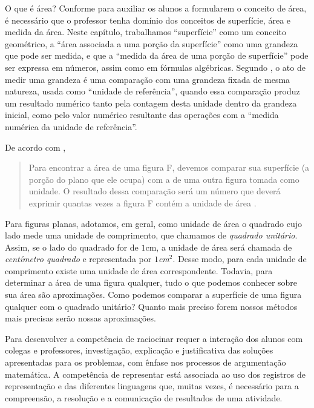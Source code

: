 \begin{paginatexto}{O que é área?}
Conforme \citet{santos2014} para auxiliar os alunos a formularem o conceito de área, é necessário que o professor tenha domínio dos conceitos de superfície, área e medida da área. Neste capítulo, trabalhamos “superfície” como um conceito geométrico, a “área associada a uma porção da superfície” como uma grandeza que pode ser medida, e que a “medida da área de uma porção de superfície” pode ser expressa em números, assim como em fórmulas algébricas. Segundo \citet{lima2013}, o ato de medir uma grandeza é uma comparação com uma grandeza fixada de mesma natureza, usada como “unidade de referência”, quando essa comparação produz um resultado numérico tanto pela contagem desta unidade dentro da grandeza inicial, como pelo valor numérico resultante das operações com a “medida numérica da unidade de referência”.

De acordo com \citet{lima2013}, 

\begin{quote}
Para encontrar a área de uma figura F, devemos comparar sua superfície (a porção do plano que ele ocupa) com a de uma outra figura tomada como unidade. O resultado dessa comparação será um número que deverá exprimir quantas vezes a figura F contém a unidade de área \citep[p. 92]{lima2013}.
\end{quote}

Para figuras planas, adotamos, em geral, como unidade de área o quadrado cujo lado mede uma unidade de comprimento, que chamamos de \textit{quadrado unitário}. Assim, se o lado do quadrado for de $1$cm, a unidade de área será chamada de \textit{centímetro quadrado} e representada por $1$\textit{cm}$^2$. Desse modo, para cada unidade de comprimento existe uma unidade de área correspondente. Todavia, para determinar a área de uma figura qualquer, tudo o que podemos conhecer sobre sua área são aproximações. Como podemos comparar a superfície de uma figura qualquer com o quadrado unitário? Quanto mais preciso forem nossos métodos mais precisas serão nossas aproximações.

Para \citet{BNCC2019} desenvolver a competência de raciocinar requer a interação dos alunos com colegas e professores, investigação, explicação e justificativa das soluções apresentadas para os problemas, com ênfase nos processos de argumentação matemática. A competência de representar está associada ao uso dos registros de representação e das diferentes linguagens que, muitas vezes, é necessário para a compreensão, a resolução e a comunicação de resultados de uma atividade. 


\end{paginatexto}
